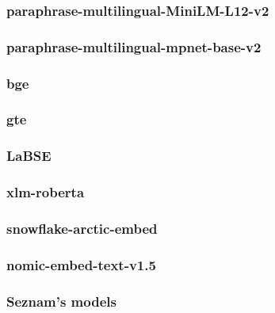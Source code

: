 \subsubsection{paraphrase-multilingual-MiniLM-L12-v2}

\subsubsection{paraphrase-multilingual-mpnet-base-v2}

\subsubsection{bge}

\subsubsection{gte}

\subsubsection{LaBSE}

\subsubsection{xlm-roberta}

\subsubsection{snowflake-arctic-embed}

\subsubsection{nomic-embed-text-v1.5}

\subsubsection{Seznam's models}





